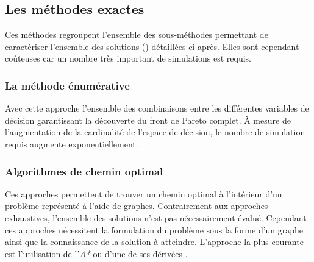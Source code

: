 \subsection{Les méthodes exactes} %
\label{sub:les_methodes_exactes}
Ces méthodes regroupent l’ensemble des sous-méthodes permettant de caractériser l’ensemble
des solutions () détaillées ci-après. Elles sont cependant
coûteuses car un nombre très important de simulations est requis.


\subsubsection{La méthode énumérative} %
\label{ssub:la_methode_enumerative}
Avec cette approche l’ensemble des combinaisons entre les différentes variables de
décision garantissant la découverte du front de Pareto complet. À mesure de
l’augmentation de la cardinalité de l’espace de décision, le nombre de simulation requis
augmente exponentiellement.


\subsubsection{Algorithmes de chemin optimal} %
\label{ssub:algorithmes_de_chemin_optimal}
Ces approches permettent de trouver un chemin optimal à l’intérieur d’un problème
représenté à l’aide de graphes. Contrairement aux approches exhaustives, l’ensemble des
solutions n’est pas nécessairement évalué. Cependant ces approches nécessitent la
formulation du problème sous la forme d’un graphe ainsi que la connaissance de la solution
à atteindre. L’approche la plus courante est l’utilisation de l’\textit{A*} ou d’une de
ses dérivées \parencite{Hart1968100}.



